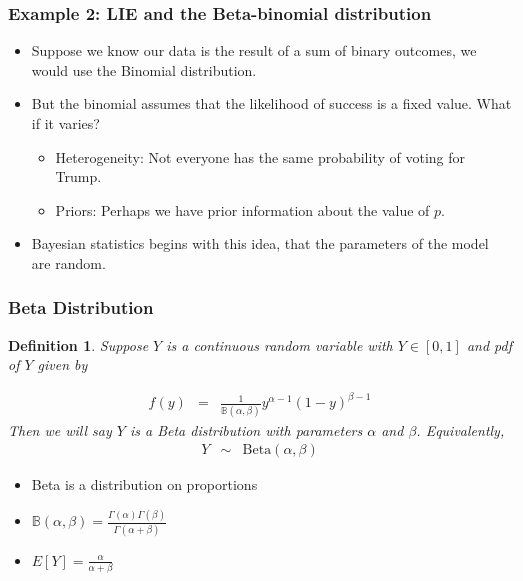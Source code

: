 \documentclass{beamer}
\newtheorem{defn}{Definition}
\numberwithin{equation}{section}
\begin{document}
\begin{frame}
\frametitle{Example 2: LIE and the Beta-binomial distribution}
\begin{itemize}
\item Suppose we know our data is the result of a sum of binary outcomes, we would use the Binomial distribution.
\item But the binomial assumes that the likelihood of success is a fixed value.  What if it varies?  
\begin{itemize}
\item Heterogeneity: Not everyone has the same probability of voting for Trump.
\item Priors: Perhaps we have prior information about the value of $p$.
\end{itemize}
\item Bayesian statistics begins with this idea, that the parameters of the model are random.    
\end{itemize}
\end{frame}


\begin{frame}
\frametitle{Beta Distribution}

\begin{defn}
Suppose $Y$ is a continuous random variable with $Y \in [0,1]$ and pdf of $Y$ given by 

\begin{eqnarray}
f(y) & = & \frac{1}{\mathbb{B}(\alpha, \beta)}y^{\alpha- 1} (1- y)^{\beta - 1 } \nonumber 
\end{eqnarray}
 \pause
Then we will say $Y$ is a \alert{Beta} distribution with parameters $\alpha$ and $\beta$.  Equivalently,
\begin{eqnarray}
Y & \sim & \text{Beta}(\alpha, \beta) \nonumber 
\end{eqnarray}


\end{defn}

\begin{itemize}
\item[-] Beta is a distribution on \alert{proportions}  
\item[-] $\mathbb{B}(\alpha, \beta)=\frac{\Gamma(\alpha)\Gamma(\beta)}{\Gamma(\alpha+\beta)}$
\item[-] $E[Y] = \frac{\alpha}{\alpha + \beta}$
\end{itemize}


\end{frame}
\end{document}

